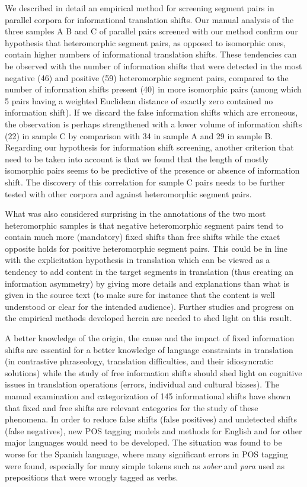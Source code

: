 \documentclass[output=paper]{langsci/langscibook}
\begin{document}
We described in detail an empirical method for screening segment pairs in parallel corpora for informational translation shifts. Our manual analysis of the three samples A B and C of parallel pairs screened with our method confirm our hypothesis that heteromorphic segment pairs, as opposed to isomorphic ones, contain higher numbers of informational translation shifts. These tendencies can be observed with the number of information shifts that were detected in the most negative (46) and positive (59) heteromorphic segment pairs, compared to the number of information shifts present (40) in more isomorphic pairs (among which 5 pairs having a weighted Euclidean distance of exactly zero contained no information shift). If we discard the false information shifts which are erroneous, the observation is perhaps strengthened with a lower volume of information shifts (22) in sample C by comparison with 34 in sample A and 29 in sample B. Regarding our hypothesis for information shift screening, another criterion that need to be taken into account is that we found that the length of mostly isomorphic pairs seems to be predictive of the presence or absence of information shift. The discovery of this correlation for sample C pairs needs to be further tested with other corpora and against heteromorphic segment pairs.

What was also considered surprising in the annotations of the two most heteromorphic samples is that negative heteromorphic segment pairs tend to contain much more (mandatory) fixed shifts than free shifts while the exact opposite holds for positive heteromorphic segment pairs. This could be in line with the explicitation hypothesis in translation which can be viewed as a tendency to add content in the target segments in translation (thus creating an information asymmetry) by giving more details and explanations than what is given in the source text (to make sure for instance that the content is well understood or clear for the intended audience). Further studies and progress on the empirical methods developed herein are needed to shed light on this result.

A better knowledge of the origin, the cause and the impact of fixed information shifts are essential for a better knowledge of language constraints in translation (in contrastive phraseology, translation difficulties, and their idiosyncratic solutions) while the study of free information shifts should shed light on cognitive issues in translation operations (errors, individual and cultural biases). The manual examination and categorization of 145 informational shifts have shown that fixed and free shifts are relevant categories for the study of these phenomena. In order to reduce false shifts (false positives) and undetected shifts (false negatives), new POS tagging models and methods for English and for other major languages would need to be developed. The situation was found to be worse for the Spanish language, where many significant errors in POS tagging were found, especially for many simple tokens such as \textit{sober} and \textit{para} used as prepositions that were wrongly tagged as verbs.
\end{document}
